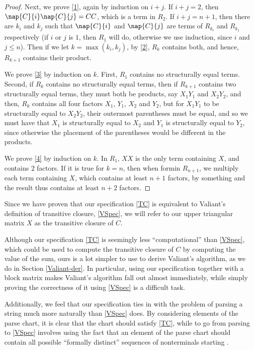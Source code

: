 \begin{proof}
Next, we prove \ref{1}, again by induction on $i + j$. If $i + j = 2$, then $\nap{C}{i}\nap{C}{j} = CC$, which is a term in $R_2$. If $i + j = n + 1$, then there are $k_i$ and $k_j$ such that $\nap{C}{i}$ and $\nap{C}{j}$ are terms of $R_{k_i}$ and $R_{k_j}$ respectively (if $i$ or $j$ is $1$, then $R_1$ will do, otherwise we use induction, since $i$ and $j \le n$). Then if we let $k = \max(k_i,k_j)$, by \ref{2}, $R_k$ contains both, and hence, $R_{k+1}$ contains their product. 

We prove \ref{3} by induction on $k$. First, $R_1$ contains no structurally equal terms. Second, if $R_k$ contains no structurally equal terms, then if $R_{k+1}$ contains two structurally equal terms, they must both be products, say $X_1Y_1$ and $X_2Y_2$, and then, $R_{k}$ contains all four factors $X_1$, $Y_1$, $X_2$ and $Y_2$, but for $X_1Y_1$ to be structurally equal to $X_2Y_2$, their outermost parentheses must be equal, and so we must have that $X_1$ is structurally equal to $X_2$ and $Y_1$ is structurally equal to $Y_2$, since otherwise the placement of the parentheses would be different in the products. 

We prove \ref{4} by induction on $k$. In $R_1$, $XX$ is the only term containing $X$, and contains $2$ factors. If it is true for $k = n$, then when formin $R_{n+1}$, we multiply each term containing $X$, which contains at least $n + 1$ factors, by something and the result thus contains at least $n+2$ factors.
\end{proof}

Since we have proven that our specification \eqref{TC} is equivalent to Valiant's definition of transitive closure, \eqref{VSpec}, we will refer to our upper triangular matrix $X$ as the transitive closure of $C$. 

Although our specification \eqref{TC} is seemingly less ``computational'' than 
\eqref{VSpec}, which could be used to compute the transitive closure of $C$ by computing the value of the sum, ours is a lot simpler to use to derive Valiant's algorithm, as we do in Section \ref{Valiant-der}. In particular, using our specification together with a block matrix makes Valiant's algorithm fall out almost immediately, while simply proving the correctness of it using \eqref{VSpec} is a difficult task.

Additionally, we feel that our specification ties in with the problem of parsing a string much more naturally than \eqref{VSpec} does. By considering elements of the parse chart, it is clear that the chart should satisfy \eqref{TC}, while to go from parsing to \eqref{VSpec} involves using the fact that an element of the parse chart should contain all possible ``formally distinct'' sequences of nonterminals starting \cite{Valiant}.

